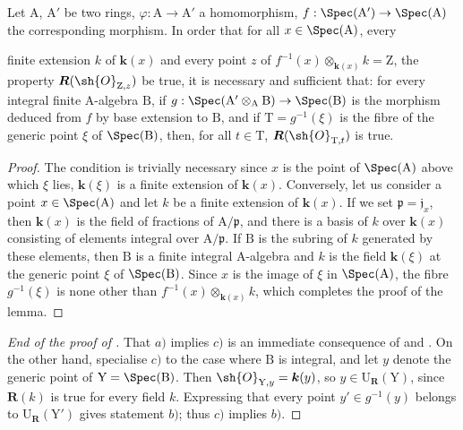 \begin{lemma}[7.3.16.2]
\label{IV.7.3.16.2}
Let $\mathrm{A}$, $\mathrm{A}'$ be two rings, $\varphi:\mathrm{A}\to\mathrm{A}'$ a homomorphism, $f:\Spec(\mathrm{A}')\to\Spec(\mathrm{A})$ the corresponding morphism.
In order that for all $x\in\Spec(\mathrm{A})$, every


finite extension $k$ of $\boldsymbol{k}(x)$ and every point $z$ of $f^{-1}(x)\otimes_{\boldsymbol{k}(x)} k=\mathrm{Z}$, the property $\boldsymbol{R}(\sh{O}_{\mathrm{Z},z})$ be true, it is necessary and sufficient that: for every integral finite A-algebra $\mathrm{B}$, if $g:\Spec(\mathrm{A}'\otimes_\mathrm{A}\mathrm{B})\to\Spec(\mathrm{B})$ is the morphism deduced from $f$ by base extension to $\mathrm{B}$, and if $\mathrm{T}=g^{-1}(\xi)$ is the fibre of the generic point $\xi$ of $\Spec(\mathrm{B})$, then, for all $t\in\mathrm{T}$, $\boldsymbol{R}(\sh{O}_{\mathrm{T},t})$ is true.
\end{lemma}

\begin{proof}
The condition is trivially necessary since $x$ is the point of $\Spec(\mathrm{A})$ above which $\xi$ lies, $\boldsymbol{k}(\xi)$ is a finite extension of $\boldsymbol{k}(x)$.
Conversely, let us consider a point $x\in\Spec(\mathrm{A})$ and let $k$ be a finite extension of $\boldsymbol{k}(x)$.
If we set $\mathfrak{p}=\mathfrak{j}_x$, then $\boldsymbol{k}(x)$ is the field of fractions of $\mathrm{A}/\mathfrak{p}$, and there is a basis of $k$ over $\boldsymbol{k}(x)$ consisting of elements integral over $\mathrm{A}/\mathfrak{p}$.
If $\mathrm{B}$ is the subring of $k$ generated by these elements, then $\mathrm{B}$ is a finite integral $\mathrm{A}$-algebra and $k$ is the field $\boldsymbol{k}(\xi)$ at the generic point $\xi$ of $\Spec(\mathrm{B})$.
Since $x$ is the image of $\xi$ in $\Spec(\mathrm{A})$, the fibre $g^{-1}(\xi)$ is none other than $f^{-1}(x)\otimes_{\boldsymbol{k}(x)}k$, which completes the proof of the lemma.
\end{proof}

\begin{proof}[End of the proof of ]
That $a)$ implies $c)$ is an immediate consequence of  and .
On the other hand, specialise $c)$ to the case where $\mathrm{B}$ is integral, and let $y$ denote the generic point of $\mathrm{Y}=\Spec(\mathrm{B})$.
Then $\sh{O}_{\mathrm{Y},y}=\boldsymbol{k}(y)$, so $y\in\mathrm{U}_{\boldsymbol{R}}(\mathrm{Y})$, since $\boldsymbol{R}(k)$ is true for every field $k$.
Expressing that every point $y'\in g^{-1}(y)$ belongs to $\mathrm{U}_{\boldsymbol{R}}(\mathrm{Y}')$ gives statement $b)$; thus $c)$ implies $b)$.
\end{proof}

